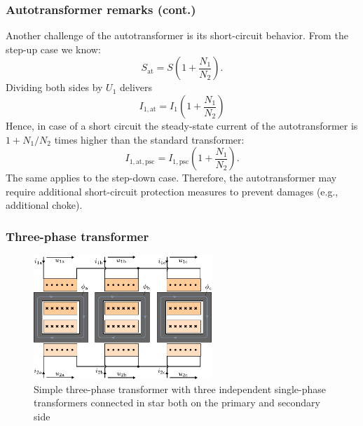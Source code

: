 \begin{frame}
	\frametitle{Autotransformer remarks (cont.)}
	Another challenge of the autotransformer is its short-circuit behavior. From the step-up case we know:
	$$ S_\mathrm{at} = S(1+\frac{N_1}{N_2}).$$ 
	\pause
	Dividing both sides by $U_1$ delivers
	\begin{equation}
		I_{1,\mathrm{at}} = I_{1}(1+\frac{N_1}{N_2})
	\end{equation}
	\pause
	Hence, in case of a short circuit the steady-state current of the autotransformer is $1+N_1/N_2$ times higher than the standard transformer:
	\begin{equation}
		I_{1,\mathrm{at,psc}} = I_{1,\mathrm{psc}}(1+\frac{N_1}{N_2}).
	\end{equation}
	\pause
	The same applies to the step-down case. Therefore, the autotransformer may require additional short-circuit protection measures to prevent damages (e.g., additional choke).
\end{frame}

\begin{frame}
	\frametitle{Three-phase transformer}
	\begin{figure}
		\includegraphics[width=0.6\textwidth]{fig/lec04/Three_phase_transformer_simple.pdf}
		\caption{Simple three-phase transformer with three independent single-phase transformers connected in star both on the primary and secondary side}
		\label{fig:Three_phase_transformer_simple}
	\end{figure}
\end{frame}

